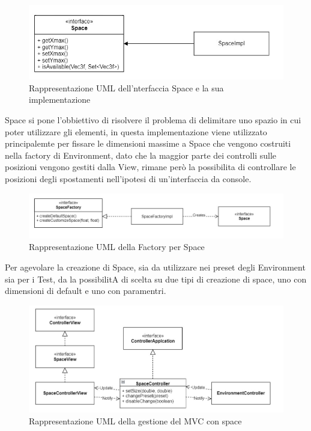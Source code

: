 \documentclass[a4paper,12pt]{report}
\begin{document}
\begin{figure}[H]
\centering{}
\includegraphics[width=\textwidth]{img/Space.png}
\caption{Rappresentazione UML dell'nterfaccia Space e la sua implementazione}
\label{img:space}
\end{figure}
Space si pone l'obbiettivo di risolvere il problema di delimitare uno spazio in cui poter utilizzare gli elementi, in questa implementazione viene utilizzato principalemte per fissare le dimensioni massime a Space che vengono costruiti nella factory di Environment, dato che la maggior parte dei controlli sulle posizioni vengono gestiti dalla View, rimane però la possibilita di controllare le posizioni degli spostamenti nell'ipotesi di un'interfaccia da console.
%
\begin{figure}[H]
\centering{}
\includegraphics[width=\textwidth]{img/SpaceFactory.png}
\caption{Rappresentazione UML della Factory per Space}
\label{img:spacefactory}
\end{figure}
Per agevolare la creazione di Space, sia da utilizzare nei preset degli Environment sia per i Test, da la possibilitA di scelta su due tipi di creazione di space, uno con dimensioni di default e uno con paramentri.
%
\begin{figure}[H]
\centering{}
\includegraphics[width=\textwidth]{img/SpaceMVC.png}
\caption{Rappresentazione UML della gestione del MVC con space}
\label{img:spacemvc}
\end{figure}
\end{document}
